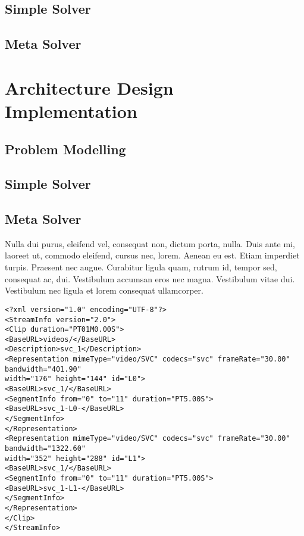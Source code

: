 \subsection{Simple Solver}

\subsection{Meta Solver}

\section{Architecture Design Implementation}


\subsection{Problem Modelling}

\subsection{Simple Solver}

\subsection{Meta Solver}





Nulla dui purus, eleifend vel, consequat non, dictum porta, nulla. Duis ante mi, laoreet ut, commodo eleifend, cursus nec, lorem. Aenean eu est. Etiam imperdiet turpis. Praesent nec augue. Curabitur ligula quam, rutrum id, tempor sed, consequat ac, dui. Vestibulum accumsan eros nec magna. Vestibulum vitae dui. Vestibulum nec ligula et lorem consequat ullamcorper. 

\begin{lstlisting}[frame=lines,style=XML,caption={Example of a XML file.},label=xmlEx]
<?xml version="1.0" encoding="UTF-8"?>
<StreamInfo version="2.0">
<Clip duration="PT01M0.00S">
<BaseURL>videos/</BaseURL>
<Description>svc_1</Description>
<Representation mimeType="video/SVC" codecs="svc" frameRate="30.00" bandwidth="401.90"
width="176" height="144" id="L0">
<BaseURL>svc_1/</BaseURL>
<SegmentInfo from="0" to="11" duration="PT5.00S">
<BaseURL>svc_1-L0-</BaseURL>
</SegmentInfo>
</Representation>
<Representation mimeType="video/SVC" codecs="svc" frameRate="30.00" bandwidth="1322.60"
width="352" height="288" id="L1">
<BaseURL>svc_1/</BaseURL>
<SegmentInfo from="0" to="11" duration="PT5.00S">
<BaseURL>svc_1-L1-</BaseURL>
</SegmentInfo>
</Representation>
</Clip>
</StreamInfo>
\end{lstlisting}

